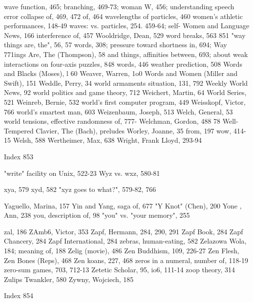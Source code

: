 wave function, 465; branching, 469-73;       woman W, 456; understanding speech error
 collapse of, 469, 472                        of, 464
wavelengths of particles, 460                women's athletic performances, 148-49
waves: vs. particles, 254. 459-64; self-     Women and Language News, 166
 interference of, 457                        Wooldridge, Dean, 529 word breaks, 563 851
"way things are, the", 56, 57                words, 308; pressure toward shortness in, 694;
Way 771ings Are, The (Thompson), 58           and things, affinities between, 693; about
weak interactions on four-axis puzzles, 848   words, 446
weather prediction, 508                      Words and Blacks (Moses), l 60
Weaver, Warren, 1o0                          Words and Women (Miller and Swift), 151
Weddle, Perry, 34                            world armaments situation, 131, 792
Weekly World News, 92                        world politics and game theory, 712
Weichert, Martin, 64                         World Series, 521
Weinreb, Bernie, 532                         world's first computer program, 449
Weisskopf, Victor, 766                       world's smartest man, 603
Weizenbaum, Joseph, 513 Welch, General, 53 world tensions, effective randomness of, 777-
Welchman, Gordon, 488                         78
Well-Tempered Clavier, The (Bach), preludes Worley, Joanne, 35
 from, 197                                   wow, 414-15
Welsh, 588 Wertheimer, Max, 638              Wright, Frank Lloyd, 293-94

 Index                                                                                  853

"write" facility on Unix, 522-23
Wyz vs. wxz, 580-81

xya, 579
xyd, 582
"xyz goes to what?", 579-82, 766

Yaguello, Marina, 157
Yin and Yang, saga of, 677
"Y Knot" (Chen), 200
Yone , Ann, 238
you, description of, 98
"you" vs. "your memory", 255

zal, 186
ZAmb6, Victor, 353
Zapf, Hermann, 284, 290, 291
Zapf Book, 284
Zapf Chancery, 284
Zapf International, 284
zebras, human-eating, 582
Zelazowa Wola, 184; meaning of, 188
Zelig (movie), 486
Zen Buddhism, 109, 226-27
Zen Flesh, Zen Bones (Reps), 468
Zen koans, 227, 468
zeros in a numeral, number of, 118-19
zero-sum games, 703, 712-13
Zetetic Scholar, 95, io6, 111-14
zoop theory, 314
Zulips Twankler, 580
Zywny, Wojciech, 185




 Index                                  854


